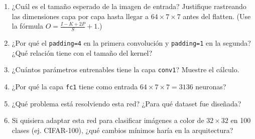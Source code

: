 \documentclass[12pt,a4paper]{article}
\begin{document}
\begin{enumerate}[label=\alph*)]
    \item ¿Cuál es el tamaño esperado de la imagen de entrada? Justifique rastreando las dimensiones capa por capa hasta llegar a $64 \times 7 \times 7$ antes del flatten. (Use la fórmula $O = \frac{I - K + 2P}{S} + 1$.)

    \item ¿Por qué el \texttt{padding=4} en la primera convolución y \texttt{padding=1} en la segunda? ¿Qué relación tiene con el tamaño del kernel?

    \item ¿Cuántos parámetros entrenables tiene la capa \texttt{conv1}? Muestre el cálculo.

    \item ¿Por qué la capa \texttt{fc1} tiene como entrada $64 \times 7 \times 7 = 3136$ neuronas?

    \item ¿Qué problema está resolviendo esta red? ¿Para qué dataset fue diseñada?

    \item Si quisiera adaptar esta red para clasificar imágenes a color de $32 \times 32$ en 100 clases (ej. CIFAR-100), ¿qué cambios mínimos haría en la arquitectura?
\end{enumerate}
\end{document}
